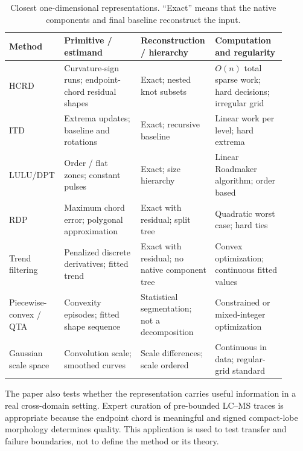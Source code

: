 \documentclass[review,onefignum,onetabnum]{siamonline250211}
\providecommand{\citep}[1]{\cite{#1}}
\begin{document}
\begin{table}[t]
\centering
\caption{Closest one-dimensional representations.  ``Exact'' means that the
native components and final baseline reconstruct the input.}
\label{tab:method-comparison}
\footnotesize
\setlength{\tabcolsep}{4pt}
\renewcommand{\arraystretch}{1.06}
\begin{tabular}{@{}>{\raggedright\arraybackslash}p{0.14\linewidth}
                    >{\raggedright\arraybackslash}p{0.27\linewidth}
                    >{\raggedright\arraybackslash}p{0.25\linewidth}
                    >{\raggedright\arraybackslash}p{0.25\linewidth}@{}}
\toprule
Method & Primitive / estimand & Reconstruction / hierarchy & Computation and regularity \\
\midrule
HCRD & Curvature-sign runs; endpoint-chord residual shapes
     & Exact; nested knot subsets
     & $O(n)$ total sparse work; hard decisions; irregular grid \\
ITD \citep{frei2007itd} & Extrema updates; baseline and rotations
     & Exact; recursive baseline
     & Linear work per level; hard extrema \\
LULU/DPT \citep{anguelov2010lulu,laurie2011roadmaker}
     & Order / flat zones; constant pulses
     & Exact; size hierarchy
     & Linear Roadmaker algorithm; order based \\
RDP \citep{douglas1973reduction}
     & Maximum chord error; polygonal approximation
     & Exact with residual; split tree
     & Quadratic worst case; hard ties \\
Trend filtering \citep{kim2009trend,tibshirani2014trend}
     & Penalized discrete derivatives; fitted trend
     & Exact with residual; no native component tree
     & Convex optimization; continuous fitted values \\
Piecewise-convex / QTA \citep{riedel2018piecewise,chowdhury2023qualitative}
     & Convexity episodes; fitted shape sequence
     & Statistical segmentation; not a decomposition
     & Constrained or mixed-integer optimization \\
Gaussian scale space \citep{babaud1986scale}
     & Convolution scale; smoothed curves
     & Scale differences; scale ordered
     & Continuous in data; regular-grid standard \\
\bottomrule
\end{tabular}
\end{table}

The paper also tests whether the representation carries useful information in
a real cross-domain setting.  Expert curation of pre-bounded LC--MS traces is
appropriate because the endpoint chord is meaningful and signed compact-lobe
morphology determines quality.  This application is used to test transfer and
failure boundaries, not to define the method or its theory.
\end{document}
